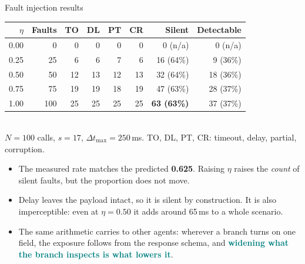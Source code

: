 \documentclass[aspectratio=169,10pt]{beamer}
\newcommand{\hl}[1]{\textcolor{teal}{\textbf{#1}}}      %
\newcommand{\risk}[1]{\textcolor{rust}{\textbf{#1}}}    %
\newcommand{\cmt}[1]{{\color{stone}\small #1}}          %
\begin{document}
\begin{frame}{Fault injection results}
  \begin{table}
    \small
    \begin{tabular}{@{}rrrrrrrr@{}}
      \toprule
      $\eta$ & Faults & TO & DL & PT & CR & Silent & Detectable\\
      \midrule
      0.00 & 0   & 0  & 0  & 0  & 0  & 0 (n/a) & 0 (n/a)\\
      0.25 & 25  & 6  & 6  & 7  & 6  & 16 (64\%) & 9 (36\%)\\
      0.50 & 50  & 12 & 13 & 12 & 13 & 32 (64\%) & 18 (36\%)\\
      0.75 & 75  & 19 & 19 & 18 & 19 & 47 (63\%) & 28 (37\%)\\
      1.00 & 100 & 25 & 25 & 25 & 25 & \risk{63 (63\%)} & 37 (37\%)\\
      \bottomrule
    \end{tabular}
    \\[0.4em]
    \cmt{$N = 100$ calls, $s = 17$, $\Delta t_{\max} = 250$\,ms.
    TO, DL, PT, CR: timeout, delay, partial, corruption.}
  \end{table}
  \vfill
  \begin{itemize}
    \item The measured rate matches the predicted \risk{0.625}. Raising $\eta$ raises the
      \emph{count} of silent faults, but the proportion does not move.
    \item Delay leaves the payload intact, so it is silent by construction. It is also
      imperceptible: even at $\eta = 0.50$ it adds around 65\,ms to a whole scenario.
    \item The same arithmetic carries to other agents: wherever a branch turns on one field,
      the exposure follows from the response schema, and \hl{widening what the branch inspects
      is what lowers it}.
  \end{itemize}
\end{frame}
\end{document}
